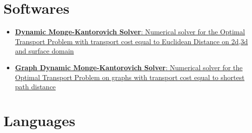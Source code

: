 \documentclass[11pt,a4paper,roman]{moderncv}
\begin{document}
 \section{Softwares}
 \begin{itemize}
 \item \href{https://gitlab.com/enrico\_facca/dmk\_solver}{\textbf{Dynamic Monge-Kantorovich Solver}: Numerical solver for the Optimal Transport Problem with transport cost equal to Euclidean Distance on 2d,3d and surface domain}
   \item
     \href{https://gitlab.com/enrico_facca/dmk_solver/-/tree/develop/graph\_otp\_solver}{\textbf{Graph
         Dynamic Monge-Kantorovich Solver}: Numerical solver for the
       Optimal Transport Problem on graphs with transport cost equal
       to shortest path distance}
 \end{itemize}
  

\section{Languages}
\end{document}
